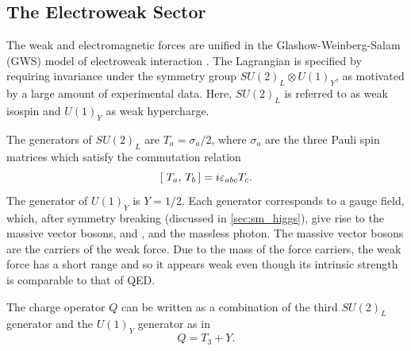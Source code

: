 \subsection{The Electroweak Sector}\label{sec:ew_sector}

The weak and electromagnetic forces are unified in the Glashow-Weinberg-Salam (GWS) model of electroweak interaction \cite{Glashow:1961tr,Weinberg:1967tq,Salam:1968rm}.
The Lagrangian is specified by requiring invariance under the symmetry group $SU(2)_L \otimes U(1)_Y$, as motivated by a large amount of experimental data.
Here, $SU(2)_L$ is referred to as weak isospin and $U(1)_Y$ as weak hypercharge.

The generators of $SU(2)_L$ are $T_a = \sigma_a/2$, where $\sigma_a$ are the three Pauli spin matrices which satisfy the commutation relation 
%
\begin{equation}
[\; T_a,\,T_b\,] = i \varepsilon_{abc} T_c .
\end{equation}
%
The generator of $U(1)_Y$ is $Y = 1/2$.
Each generator corresponds to a gauge field, which, after symmetry breaking (discussed in \cref{sec:sm_higgs}), give rise to the massive vector bosons, \Wpm and \Zboson, and the massless photon.
The massive vector bosons are the carriers of the weak force.
Due to the mass of the force carriers, the weak force has a short range and so it appears weak even though its intrinsic strength is comparable to that of QED.

The charge operator $Q$ can be written as a combination of the third $SU(2)_L$ generator and the $U(1)_Y$ generator as in
%
\begin{equation}\label{eq:charge_operator}
  Q = T_3 + Y .
\end{equation}
%

